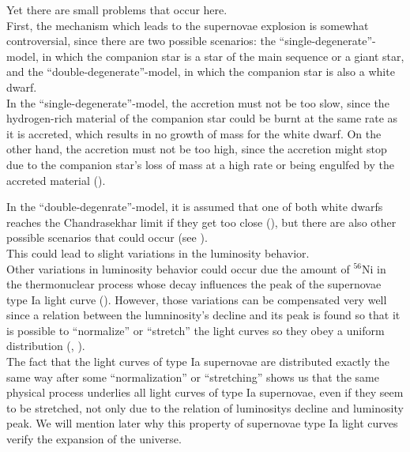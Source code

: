 \noindent Yet there are small problems that occur here. \\
First, the mechanism which leads to the supernovae explosion is somewhat controversial, since there are two possible scenarios: the ``single-degenerate''-model, in which the companion star is a star of the main sequence or a giant star, and the ``double-degenerate''-model, in which the companion star is also a white dwarf. \\

\noindent In the ``single-degenerate''-model, the accretion must not be too slow, since the hydrogen-rich material of the companion star could be burnt at the same rate as it is accreted, which results in no growth of mass for the white dwarf. On the other hand, the accretion must not be too high, since the accretion might stop due to the companion star's loss of mass at a high rate or being engulfed by the accreted material (\cite[p.~308]{Maguire2017}).

\noindent In the ``double-degenrate''-model, it is assumed that one of both white dwarfs reaches the Chandrasekhar limit if they get too close (\cite[p.~48]{Bartelmann2019}), but there are also other possible scenarios that could occur (see \cite[p.~308/309]{Maguire2017}). \\
\noindent This could lead to slight variations in the luminosity behavior. \\


\noindent Other variations in luminosity behavior could occur due the amount of $^{56}$Ni in the thermonuclear process whose decay influences the peak of the supernovae type Ia light curve (\cite[p.~295]{Maguire2017}). However, those variations can be compensated very well since a relation between the lumninosity's decline and its peak is found so that it is possible to ``normalize'' or ``stretch'' the light curves so they obey a uniform distribution (\cite[p.~4]{Perlmutter2003}, \cite{Phillips1993}).\\
The fact that the light curves of type Ia supernovae are distributed exactly the same way after some ``normalization'' or ``stretching'' shows us that the same physical process underlies all light curves of type Ia supernovae, even if they seem to be stretched, not only due to the relation of luminositys decline and luminosity peak. We will mention later why this property of supernovae type Ia light curves verify the expansion of the universe.

